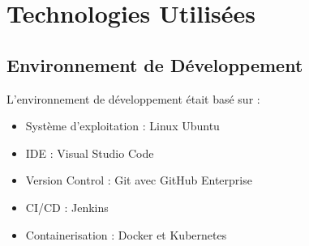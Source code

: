 \section{Technologies Utilisées}
\subsection{Environnement de Développement}
L'environnement de développement était basé sur :
\begin{itemize}
    \item Système d'exploitation : Linux Ubuntu
    \item IDE : Visual Studio Code
    \item Version Control : Git avec GitHub Enterprise
    \item CI/CD : Jenkins
    \item Containerisation : Docker et Kubernetes
\end{itemize}

